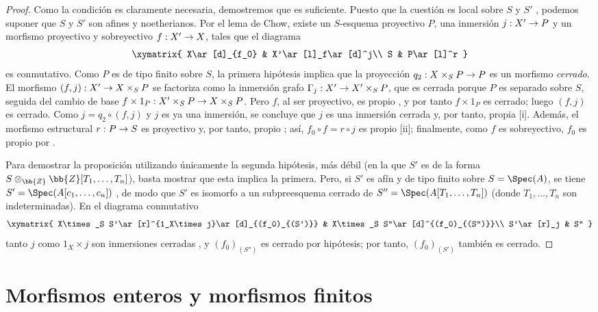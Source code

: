 \documentclass[oneside,10pt]{amsart}
\makeatletter
\newcommand{\ega@arrow}[2]{\mathchoice{#1}{#2}{#2}{#2}}
\renewcommand{\to}{\ega@arrow{\longrightarrow}{\rightarrow}}
\newcommand{\oldpage}[2][]{\marginnote{\normalfont\footnotesize\textbf{#1}~|~#2}\ignorespaces}
\let\EGAOriginalLabel\label
\renewcommand{\label}[1]{\phantomsection\EGAOriginalLabel{#1}}
\makeatother
\begin{document}
\begin{proof}
Como la condición es claramente necesaria, demostremos que es suficiente.
Puesto que la cuestión es local sobre $S$ y $S'$ , podemos suponer que $S$ y $S'$ son afines y noetherianos.
Por el lema de Chow, existe un $S$-esquema proyectivo $P$, una inmersión $j:X'\to P$ y un morfismo proyectivo y sobreyectivo $f:X'\to X$, tales que el diagrama
\[
  \xymatrix{
    X\ar[d]_{f_0} &
    X'\ar[l]_f\ar[d]^j\\
    S &
    P\ar[l]^r
  }
\]
es conmutativo.
Como $P$ es de tipo finito sobre $S$, la primera hipótesis implica que la proyección $q_2:X\times_S P\to P$ es un morfismo \emph{cerrado}.
El morfismo $(f,j):X'\to X\times_S P$ se factoriza como la inmersión grafo $\Gamma_j:X'\to X'\times_S P$, que es cerrada porque $P$ es separado sobre $S$, seguida del cambio de base $f\times1_P:X'\times_S P\to X\times_S P$.
Pero $f$, al ser proyectivo, es propio , y por tanto $f\times1_P$ es cerrado; luego $(f,j)$ es cerrado.
Como $j=q_2\circ(f,j)$ y $j$ es ya una inmersión, se concluye que $j$ es una inmersión cerrada y, por tanto, propia [i].
Además, el morfismo estructural $r:P\to S$ es proyectivo y, por tanto, propio ; así, $f_0\circ f=r\circ j$ es propio [ii];
finalmente, como $f$ es sobreyectivo, $f_0$ es propio por .

Para demostrar la proposición utilizando únicamente la segunda hipótesis, más débil (en la que $S'$ es de la forma $S\otimes_\bb{Z}\bb{Z}[T_1,\ldots,T_n]$), basta mostrar que esta implica la primera.
Pero, si $S'$ es afín y de tipo finito sobre $S=\Spec(A)$,
\oldpage[II]{110}
se tiene $S'=\Spec(A[c_1,\ldots,c_n])$ , de modo que $S'$ es isomorfo a un subpreesquema cerrado de $S''=\Spec(A[T_1,\ldots,T_n])$ (donde $T_1,\ldots,T_n$ son indeterminadas).
En el diagrama conmutativo
\[
  \xymatrix{
    X\times_S S'\ar[r]^{1_X\times j}\ar[d]_{(f_0)_{(S')}} &
    X\times_S S''\ar[d]^{(f_0)_{(S'')}}\\
    S'\ar[r]_j &
    S''
  }
\]
tanto $j$ como $1_X\times j$ son inmersiones cerradas , y $(f_0)_{(S'')}$ es cerrado por hipótesis; por tanto, $(f_0)_{(S')}$ también es cerrado.
\end{proof}

\section{Morfismos enteros y morfismos finitos}
\label{section:II.6}
\end{document}
